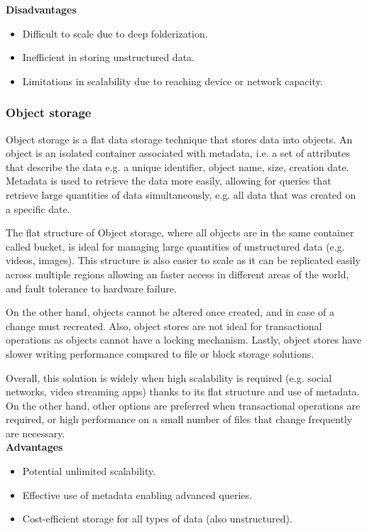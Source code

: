 \noindent\textbf{Disadvantages}
\begin{itemize}
    \item Difficult to scale due to deep folderization.
    \item Inefficient in storing unstructured data.
    \item Limitations in scalability due to reaching device or network capacity.
\end{itemize}

\subsubsection*{Object storage}

Object storage is a flat data storage technique that stores data into objects. An object is an isolated container associated with metadata, i.e. a set of attributes that describe the data e.g. a unique identifier, object name, size, creation date. Metadata is used to retrieve the data more easily, allowing for queries that retrieve large quantities of data simultaneously, e.g. all data that was created on a specific date. 

The flat structure of Object storage, where all objects are in the same container called bucket, is ideal for managing large quantities of unstructured data (e.g. videos, images). This structure is also easier to scale as it can be replicated easily across multiple regions allowing an faster access in different areas of the world, and fault tolerance to hardware failure.

On the other hand, objects cannot be altered once created, and in case of a change must recreated. Also, object stores are not ideal for transactional operations as objects cannot have a locking mechanism. Lastly, object stores have slower writing performance compared to file or block storage solutions.

Overall, this solution is widely when high scalability is required (e.g. social networks, video streaming apps) thanks to its flat structure and use of metadata. On the other hand, other options are preferred when transactional operations are required, or high performance on a small number of files that change frequently are necessary. \\[3mm]
\noindent\textbf{Advantages}
\begin{itemize}
    \item Potential unlimited scalability.
    \item Effective use of metadata enabling advanced queries.
    \item Cost-efficient storage for all types of data (also unstructured).
\end{itemize}

